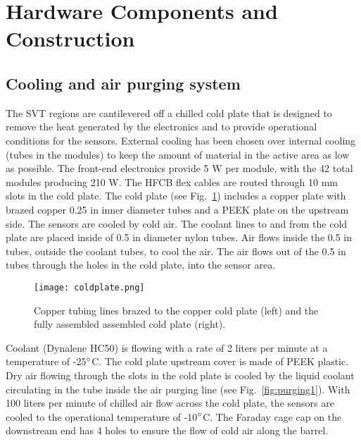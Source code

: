 \section{Hardware Components and Construction}

\subsection{Cooling and air purging system}

The SVT regions are cantilevered off a chilled cold plate that is designed to remove the heat generated by the electronics and to provide operational  conditions for the sensors. External cooling has been chosen over internal cooling (tubes in the modules) to keep the amount of material in the active area as low as possible. The front-end electronics provide 5 W per module, with the 42 total modules producing 210 W. The HFCB flex cables are routed through 10 mm slots in the cold plate. The cold plate (see Fig.~\ref{fig:coldplate}) includes a copper plate with brazed  copper 0.25 in inner diameter tubes and a PEEK plate on the upstream side. The sensors are cooled by cold air.  The coolant lines to and from the cold plate are placed inside of 0.5 in diameter nylon tubes.  Air flows inside the 0.5 in tubes, outside the coolant tubes, to cool the air.  The air flows out of the 0.5 in tubes through the holes in the cold plate, into the sensor area.

\begin{figure}[hbt] 
\centering 
\texttt{[image: coldplate.png]}
\caption{Copper tubing lines brazed to the copper cold plate (left) and the fully assembled assembled cold plate (right).}
\label{fig:coldplate}
\end{figure}


Coolant (Dynalene HC50) is flowing with a rate of 2 liters per minute at a temperature of -25$\degree$C. The cold plate upstream cover is made of PEEK plastic. Dry air flowing through the slots in the cold plate is cooled by the liquid coolant circulating in the tube inside the air purging line (see Fig.~\ref{fig:purging1}). With 100 liters per minute of chilled air flow across the cold plate, the sensors are cooled to the operational temperature of -10$\degree$C. The Faraday cage cap on the downstream end has 4 holes to ensure the flow of cold air along the barrel. 

